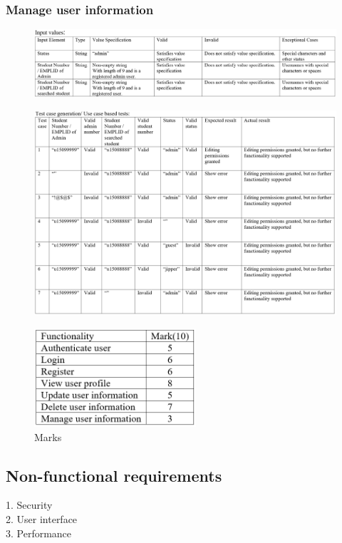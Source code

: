\documentclass[english]{article}
\begin{document}
\subsubsection{Manage user information}
\begin{figure}[ht!]
\hspace*{-2.5cm}
\includegraphics[width=180mm]{13.png}
\end{figure}
\begin{figure}[ht!]
\hspace*{-2.5cm}
\includegraphics[width=180mm]{14.png}
\end{figure}
\clearpage
\begin{figure}[ht!]
\center
\includegraphics[width=60mm]{Marks.png}
\caption{Marks}
\end{figure}
\subsection{Non-functional requirements}
1.	Security\\
2.	User interface\\
3.	Performance\\
\end{document}
